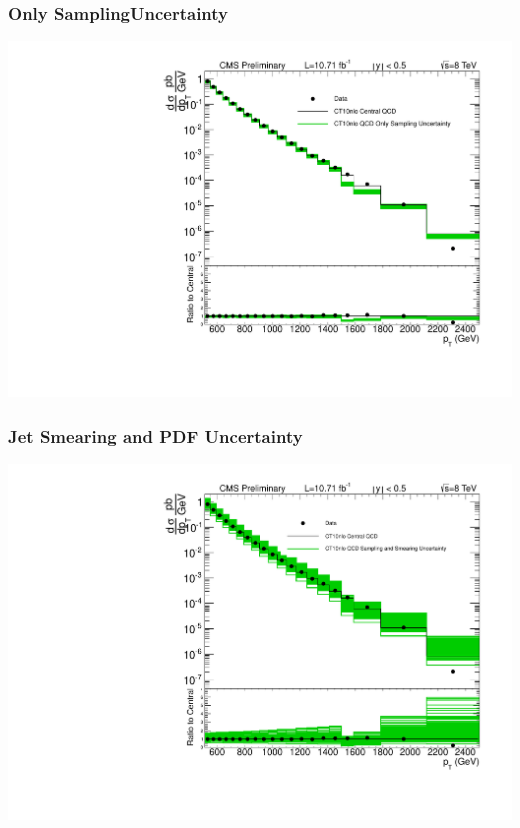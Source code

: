 \documentclass{beamer}
\begin{document}
\begin{frame}
	\frametitle{Only SamplingUncertainty}
	\begin{*figure}
\begin{center}
 \vspace {0.05 in}
 \includegraphics [width=0.7\linewidth] {xsec_CT10nlo_QCD_only_sampling.pdf}
 \vspace {0.05 in}
\caption{}
\end{center}
\end{*figure} 
\end{frame}

\begin{frame}
	\frametitle{Jet Smearing and PDF Uncertainty}
	\begin{*figure}
\begin{center}
 \vspace {0.05 in}
 \includegraphics [width=0.7\linewidth] {xsec_CT10_QCD_sampled_and_smeared.pdf}
 \vspace {0.05 in}
\caption{ }
\end{center}
\end{*figure} 
\end{frame}
\end{document}
